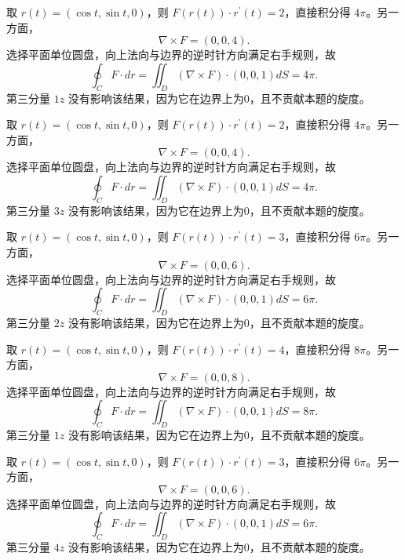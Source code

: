 \documentclass[UTF8,12pt,a4paper,fontset=fandol]{ctexart}
\begin{document}
\begin{solve}\label{ans:c43q20}
取 $r(t)=(\cos t,\sin t,0)$，则 $F(r(t))\cdot r^{\prime}(t)=2$，直接积分得 $4\pi$。另一方面，
\[
\nabla\times F=(0,0,4).
\]
选择平面单位圆盘，向上法向与边界的逆时针方向满足右手规则，故
\[
\oint_C F\cdot dr=\iint_D(\nabla\times F)\cdot(0,0,1)dS=4\pi.
\]
第三分量 $1z$ 没有影响该结果，因为它在边界上为0，且不贡献本题的旋度。
\end{solve}

\begin{solve}\label{ans:c43q21}
取 $r(t)=(\cos t,\sin t,0)$，则 $F(r(t))\cdot r^{\prime}(t)=2$，直接积分得 $4\pi$。另一方面，
\[
\nabla\times F=(0,0,4).
\]
选择平面单位圆盘，向上法向与边界的逆时针方向满足右手规则，故
\[
\oint_C F\cdot dr=\iint_D(\nabla\times F)\cdot(0,0,1)dS=4\pi.
\]
第三分量 $3z$ 没有影响该结果，因为它在边界上为0，且不贡献本题的旋度。
\end{solve}

\begin{solve}\label{ans:c43q22}
取 $r(t)=(\cos t,\sin t,0)$，则 $F(r(t))\cdot r^{\prime}(t)=3$，直接积分得 $6\pi$。另一方面，
\[
\nabla\times F=(0,0,6).
\]
选择平面单位圆盘，向上法向与边界的逆时针方向满足右手规则，故
\[
\oint_C F\cdot dr=\iint_D(\nabla\times F)\cdot(0,0,1)dS=6\pi.
\]
第三分量 $2z$ 没有影响该结果，因为它在边界上为0，且不贡献本题的旋度。
\end{solve}

\begin{solve}\label{ans:c43q23}
取 $r(t)=(\cos t,\sin t,0)$，则 $F(r(t))\cdot r^{\prime}(t)=4$，直接积分得 $8\pi$。另一方面，
\[
\nabla\times F=(0,0,8).
\]
选择平面单位圆盘，向上法向与边界的逆时针方向满足右手规则，故
\[
\oint_C F\cdot dr=\iint_D(\nabla\times F)\cdot(0,0,1)dS=8\pi.
\]
第三分量 $1z$ 没有影响该结果，因为它在边界上为0，且不贡献本题的旋度。
\end{solve}

\begin{solve}\label{ans:c43q24}
取 $r(t)=(\cos t,\sin t,0)$，则 $F(r(t))\cdot r^{\prime}(t)=3$，直接积分得 $6\pi$。另一方面，
\[
\nabla\times F=(0,0,6).
\]
选择平面单位圆盘，向上法向与边界的逆时针方向满足右手规则，故
\[
\oint_C F\cdot dr=\iint_D(\nabla\times F)\cdot(0,0,1)dS=6\pi.
\]
第三分量 $4z$ 没有影响该结果，因为它在边界上为0，且不贡献本题的旋度。
\end{solve}
\end{document}
